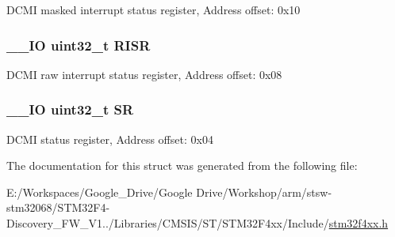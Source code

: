 D\-C\-M\-I masked interrupt status register, Address offset\-: 0x10 \hypertarget{struct_d_c_m_i___type_def_aa196fddf0ba7d6e3ce29bdb04eb38b94}{
\subsubsection[{R\-I\-S\-R}]{\setlength{\rightskip}{0pt plus 5cm}\-\_\-\-\_\-\-I\-O uint32\-\_\-t R\-I\-S\-R}}\label{struct_d_c_m_i___type_def_aa196fddf0ba7d6e3ce29bdb04eb38b94}
D\-C\-M\-I raw interrupt status register, Address offset\-: 0x08 \hypertarget{struct_d_c_m_i___type_def_af6aca2bbd40c0fb6df7c3aebe224a360}{
\subsubsection[{S\-R}]{\setlength{\rightskip}{0pt plus 5cm}\-\_\-\-\_\-\-I\-O uint32\-\_\-t S\-R}}\label{struct_d_c_m_i___type_def_af6aca2bbd40c0fb6df7c3aebe224a360}
D\-C\-M\-I status register, Address offset\-: 0x04 

The documentation for this struct was generated from the following file\-:\begin{DoxyCompactItemize}
\item 
E\-:/\-Workspaces/\-Google\-\_\-\-Drive/\-Google Drive/\-Workshop/arm/stsw-\/stm32068/\-S\-T\-M32\-F4-\/\-Discovery\-\_\-\-F\-W\-\_\-\-V1../\-Libraries/\-C\-M\-S\-I\-S/\-S\-T/\-S\-T\-M32\-F4xx/\-Include/\hyperlink{stm32f4xx_8h}{stm32f4xx.\-h}\end{DoxyCompactItemize}

